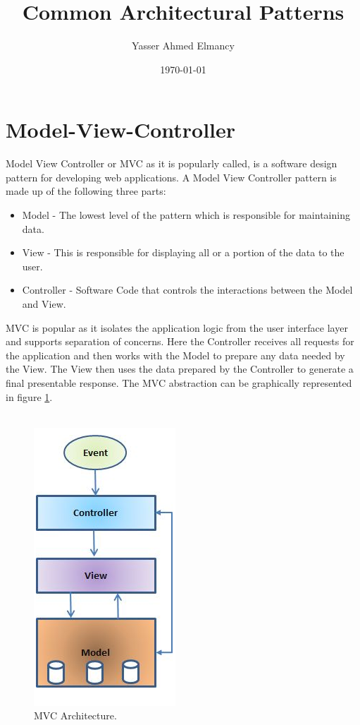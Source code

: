 \documentclass{article}
\begin{document}
\title{Common Architectural Patterns}
\author{Yasser Ahmed Elmancy}
\date{\today}
\maketitle

\tableofcontents
\newpage

\section{Model-View-Controller}

Model View Controller or MVC as it is popularly called, is a software design pattern for developing web applications. A Model View Controller pattern is made up of the following three parts:

\begin{itemize}

\item Model - The lowest level of the pattern which is responsible for maintaining data.
\item View - This is responsible for displaying all or a portion of the data to the user.
\item Controller - Software Code that controls the interactions between the Model and View.

\end{itemize}

\noindent MVC is popular as it isolates the application logic from the user interface layer and supports separation of concerns. Here the Controller receives all requests for the application and then works with the Model to prepare any data needed by the View. The View then uses the data prepared by the Controller to generate a final presentable response. The MVC abstraction can be graphically represented in figure \ref{fig_mvc}.\\\\

\begin{figure}[h]
\centering
\includegraphics[scale=0.8]{mvc.png}
\caption{MVC Architecture.}
\label{fig_mvc}
\end{figure}
\end{document}
